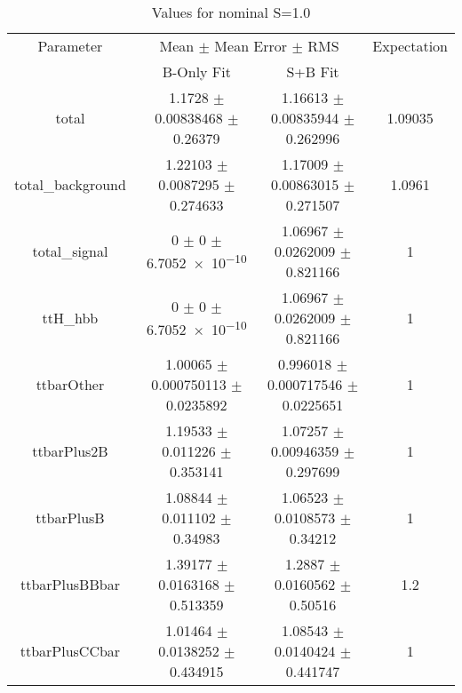 \begin{table}
\centering
\caption{Values for nominal S=1.0}
\begin{tabular}{cccc}
\toprule
Parameter & \multicolumn{2}{c}{Mean $\pm$ Mean Error $\pm$ RMS} & Expectation\\
 & B-Only Fit & S+B Fit & \\
\midrule
total & \num{1.1728} $\pm$ \num{0.00838468} $\pm$ \num{0.26379} & \num{1.16613} $\pm$ \num{0.00835944} $\pm$ \num{0.262996} & \num{1.09035}\\
total\_background & \num{1.22103} $\pm$ \num{0.0087295} $\pm$ \num{0.274633} & \num{1.17009} $\pm$ \num{0.00863015} $\pm$ \num{0.271507} & \num{1.0961}\\
total\_signal & \num{0} $\pm$ \num{0} $\pm$ \num{6.7052e-10} & \num{1.06967} $\pm$ \num{0.0262009} $\pm$ \num{0.821166} & \num{1}\\
ttH\_hbb & \num{0} $\pm$ \num{0} $\pm$ \num{6.7052e-10} & \num{1.06967} $\pm$ \num{0.0262009} $\pm$ \num{0.821166} & \num{1}\\
ttbarOther & \num{1.00065} $\pm$ \num{0.000750113} $\pm$ \num{0.0235892} & \num{0.996018} $\pm$ \num{0.000717546} $\pm$ \num{0.0225651} & \num{1}\\
ttbarPlus2B & \num{1.19533} $\pm$ \num{0.011226} $\pm$ \num{0.353141} & \num{1.07257} $\pm$ \num{0.00946359} $\pm$ \num{0.297699} & \num{1}\\
ttbarPlusB & \num{1.08844} $\pm$ \num{0.011102} $\pm$ \num{0.34983} & \num{1.06523} $\pm$ \num{0.0108573} $\pm$ \num{0.34212} & \num{1}\\
ttbarPlusBBbar & \num{1.39177} $\pm$ \num{0.0163168} $\pm$ \num{0.513359} & \num{1.2887} $\pm$ \num{0.0160562} $\pm$ \num{0.50516} & \num{1.2}\\
ttbarPlusCCbar & \num{1.01464} $\pm$ \num{0.0138252} $\pm$ \num{0.434915} & \num{1.08543} $\pm$ \num{0.0140424} $\pm$ \num{0.441747} & \num{1}\\
\bottomrule
\end{tabular}
\end{table}